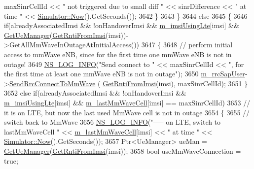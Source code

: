 \begin{DoxyCode}
      maxSinrCellId << \textcolor{stringliteral}{" not triggered due to small diff "} << sinrDifference << \textcolor{stringliteral}{" at time "} << 
      \hyperlink{classns3_1_1Simulator_ac3178fa975b419f7875e7105be122800}{Simulator::Now}().GetSeconds());
3642     \}
3643   \}
3644   \textcolor{keywordflow}{else}
3645   \{
3646     \textcolor{keywordflow}{if}(alreadyAssociatedImsi && !onHandoverImsi && \hyperlink{classns3_1_1LteEnbRrc_a99427e888b10d095491e72bf062511db}{m\_imsiUsingLte}[imsi] && 
      \hyperlink{classns3_1_1LteEnbRrc_a875653948b565dc50b33f6a0434e32d9}{GetUeManager}(\hyperlink{classns3_1_1LteEnbRrc_a98f4b8f727e844ab621e447b7178ddc2}{GetRntiFromImsi}(imsi))->GetAllMmWaveInOutageAtInitialAccess())
3647     \{
3648       \textcolor{comment}{// perform initial access to mmWave eNB, since for the first time one mmWave eNB is not in outage!}
3649       \hyperlink{group__logging_gafbd73ee2cf9f26b319f49086d8e860fb}{NS\_LOG\_INFO}(\textcolor{stringliteral}{"Send connect to "} << maxSinrCellId << \textcolor{stringliteral}{", for the first time at least one
       mmWave eNB is not in outage"});
3650       \hyperlink{classns3_1_1LteEnbRrc_a7bbf35518d70915fcd24d68a835fe6af}{m\_rrcSapUser}->\hyperlink{classns3_1_1LteEnbRrcSapUser_aee87f06442e7688b7d81fab229857ed4}{SendRrcConnectToMmWave} (
      \hyperlink{classns3_1_1LteEnbRrc_a98f4b8f727e844ab621e447b7178ddc2}{GetRntiFromImsi}(imsi), maxSinrCellId);   
3651     \}
3652     \textcolor{keywordflow}{else} \textcolor{keywordflow}{if}(alreadyAssociatedImsi && !onHandoverImsi && \hyperlink{classns3_1_1LteEnbRrc_a99427e888b10d095491e72bf062511db}{m\_imsiUsingLte}[imsi] && 
      \hyperlink{classns3_1_1LteEnbRrc_a0d7b04f0383b0dc3f6a7360b87cbaeee}{m\_lastMmWaveCell}[imsi] == maxSinrCellId) 
3653     \textcolor{comment}{// it is on LTE, but now the last used MmWave cell is not in outage}
3654     \{
3655       \textcolor{comment}{// switch back to MmWave}
3656       \hyperlink{group__logging_gafbd73ee2cf9f26b319f49086d8e860fb}{NS\_LOG\_INFO}(\textcolor{stringliteral}{"----- on LTE, switch to lastMmWaveCell "} << 
      \hyperlink{classns3_1_1LteEnbRrc_a0d7b04f0383b0dc3f6a7360b87cbaeee}{m\_lastMmWaveCell}[imsi] << \textcolor{stringliteral}{" at time "} << \hyperlink{classns3_1_1Simulator_ac3178fa975b419f7875e7105be122800}{Simulator::Now}().GetSeconds());
3657       Ptr<UeManager> ueMan = \hyperlink{classns3_1_1LteEnbRrc_a875653948b565dc50b33f6a0434e32d9}{GetUeManager}(\hyperlink{classns3_1_1LteEnbRrc_a98f4b8f727e844ab621e447b7178ddc2}{GetRntiFromImsi}(imsi));
3658       \textcolor{keywordtype}{bool} useMmWaveConnection = \textcolor{keyword}{true};

\end{DoxyCode}
